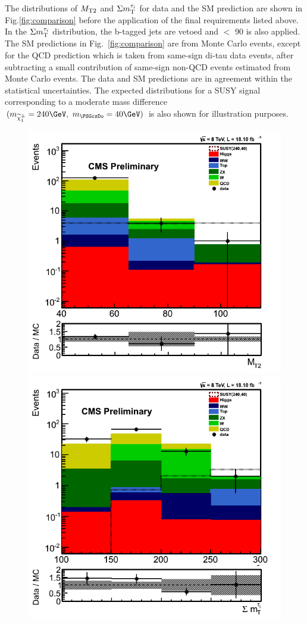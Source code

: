 The distributions of ${M_{\rm T2}}$ and $\Sigma m_{\rm T}^{\tau_i}$ for data and the SM prediction
are shown in Fig.\ref{fig:comparison} before the application of the final
requirements listed above.
In the $\Sigma m_{\rm T}^{\tau_i}$ distribution, the b-tagged jets are vetoed and \mttwo $<$ 90 \GeV is also applied.
The SM predictions in Fig.~\ref{fig:comparison} 
are from Monte Carlo events, except for the
QCD prediction which is taken from same-sign di-tau data events,
after subtracting a small contribution of same-sign non-QCD events estimated from Monte Carlo events.
The data and SM predictions are in agreement within the statistical uncertainties.
The expected distributions for a SUSY signal 
corresponding to a moderate mass difference $(m_{\chione}=240\GeV,~m_{\PSGczDo}=40\GeV)$
is also shown for illustration purposes.
\begin{figure}[!Hhtb]
\centering
\includegraphics[angle=0,scale=0.375]{TauTauFigs/mt2.png}
\includegraphics[angle=0,scale=0.375]{TauTauFigs/summt.png} \\ 

\end{figure}
